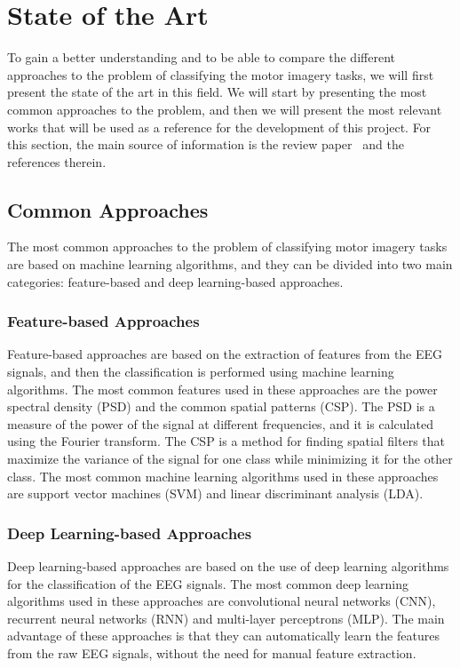\chapter{State of the Art}\label{ch:state_of_the_art}
To gain a better understanding and to be able to compare the different approaches to the problem of classifying the motor imagery tasks, we will first present the state of the art in this field. 
We will start by presenting the most common approaches to the problem, and then we will present the most relevant works that will be used as a reference for the development of this project.
For this section, the main source of information is the review paper~\cite{altaheri2023deep} and the references therein.

\section{Common Approaches}
The most common approaches to the problem of classifying motor imagery tasks are based on machine learning algorithms, and they can be divided into two main categories: feature-based and deep learning-based approaches.

\subsection{Feature-based Approaches}
Feature-based approaches are based on the extraction of features from the EEG signals, and then the classification is performed using machine learning algorithms.
The most common features used in these approaches are the power spectral density (PSD) and the common spatial patterns (CSP).
The PSD is a measure of the power of the signal at different frequencies, and it is calculated using the Fourier transform.
The CSP is a method for finding spatial filters that maximize the variance of the signal for one class while minimizing it for the other class.
The most common machine learning algorithms used in these approaches are support vector machines (SVM) and linear discriminant analysis (LDA).

\subsection{Deep Learning-based Approaches}
Deep learning-based approaches are based on the use of deep learning algorithms for the classification of the EEG signals.
The most common deep learning algorithms used in these approaches are convolutional neural networks (CNN), recurrent neural networks (RNN) and multi-layer perceptrons (MLP).
The main advantage of these approaches is that they can automatically learn the features from the raw EEG signals, without the need for manual feature extraction.

